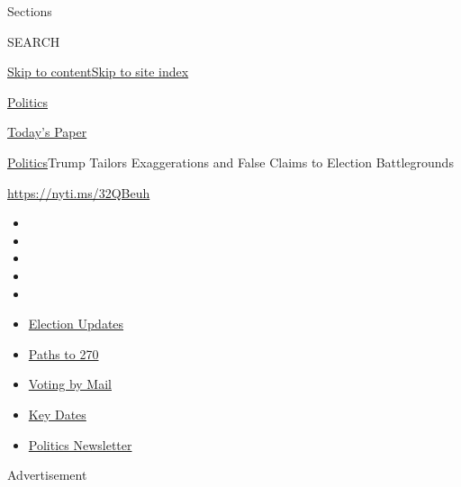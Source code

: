 Sections

SEARCH

\protect\hyperlink{site-content}{Skip to
content}\protect\hyperlink{site-index}{Skip to site index}

\href{https://www.nytimes3xbfgragh.onion/section/politics}{Politics}

\href{https://myaccount.nytimes3xbfgragh.onion/auth/login?response_type=cookie\&client_id=vi}{}

\href{https://www.nytimes3xbfgragh.onion/section/todayspaper}{Today's
Paper}

\href{/section/politics}{Politics}\textbar{}Trump Tailors Exaggerations
and False Claims to Election Battlegrounds

\url{https://nyti.ms/32QBeuh}

\begin{itemize}
\item
\item
\item
\item
\item
\end{itemize}

\begin{itemize}
\item
  \href{https://www.nytimes3xbfgragh.onion/live/2020/09/08/us/trump-vs-biden?action=click\&pgtype=Article\&state=default\&region=TOP_BANNER\&context=storylines_menu}{Election
  Updates}
\item
  \href{https://www.nytimes3xbfgragh.onion/interactive/2020/us/elections/election-states-biden-trump.html?action=click\&pgtype=Article\&state=default\&region=TOP_BANNER\&context=storylines_menu}{Paths
  to 270}
\item
  \href{https://www.nytimes3xbfgragh.onion/interactive/2020/08/31/us/politics/vote-by-mail-deadlines.html?action=click\&pgtype=Article\&state=default\&region=TOP_BANNER\&context=storylines_menu}{Voting
  by Mail}
\item
  \href{https://www.nytimes3xbfgragh.onion/interactive/2019/us/elections/2020-presidential-election-calendar.html?action=click\&pgtype=Article\&state=default\&region=TOP_BANNER\&context=storylines_menu}{Key
  Dates}
\item
  \href{https://www.nytimes3xbfgragh.onion/newsletters/politics?action=click\&pgtype=Article\&state=default\&region=TOP_BANNER\&context=storylines_menu}{Politics
  Newsletter}
\end{itemize}

Advertisement

